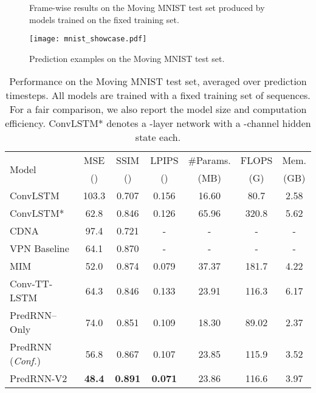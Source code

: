 \documentclass[10pt,journal,compsoc]{IEEEtran}
\begin{document}
\begin{figure*}[t]
\centering
\vskip -0.1in
\caption{Frame-wise results on the Moving MNIST test set produced by models trained on the fixed training set.}
\label{fig:mnist_frame}
\vspace{-15pt}
\end{figure*}

\begin{figure*}[t]
  \centering
  \texttt{[image: mnist\_showcase.pdf]}
  \vskip -0.05in
  \caption{Prediction examples on the Moving MNIST test set.}
  \label{fig:mnist_result}
  \vspace{-15pt}
\end{figure*}



\begin{table}[t]
\vskip 0.05in
  \caption{Performance on the Moving MNIST test set, averaged over  prediction timesteps. All models are trained with a fixed training set of  sequences. For a fair comparison, we also report the model size and computation efficiency. ConvLSTM* denotes a -layer network with a -channel hidden state each.
  }
  \vskip -0.05in
  \label{tab:mnist_mse}
  \centering
  \setlength{\tabcolsep}{3.8pt}
  \begin{tabular}{lcccccc}
    \toprule
    \multirow{2}{*}{Model} & MSE & SSIM  & LPIPS & \#Params. & FLOPS & Mem.  \\
    & () & () &  () & (MB) & (G) & (GB) \\
    \midrule
ConvLSTM \cite{shi2015convolutional} & 103.3& 0.707  & 0.156 & 16.60 & 80.7 & 2.58 \\
    ConvLSTM* \cite{shi2015convolutional} & 62.8 & 0.846  & 0.126 & 65.96 & 320.8 & 5.62 \\
    CDNA \cite{Finn2016Unsupervised} & 97.4& 0.721  & - & - & - & - \\
    VPN Baseline \cite{Kalchbrenner2016Video} & 64.1& 0.870  & - & - & - & - \\
    MIM \cite{wang2019memory} & 52.0 & 0.874 & 0.079 & 37.37 & 181.7 & 4.22 \\
Conv-TT-LSTM \cite{su2020convolutional} & 64.3 & 0.846  & 0.133 & 23.91 & 116.3 & 6.17 \\
\midrule
    PredRNN--Only & 74.0 & 0.851 & 0.109 & 18.30 & 89.02 & 2.37 \\
    PredRNN (\textit{Conf.}) & 56.8 & 0.867 & 0.107 & 23.85 & 115.9 & 3.52 \\
    PredRNN-V2 & \textbf{48.4} & \textbf{0.891} & \textbf{0.071} & 23.86 & 116.6 & 3.97 \\
\bottomrule
  \end{tabular}
  \vspace{-10pt}
\end{table}
\end{document}
